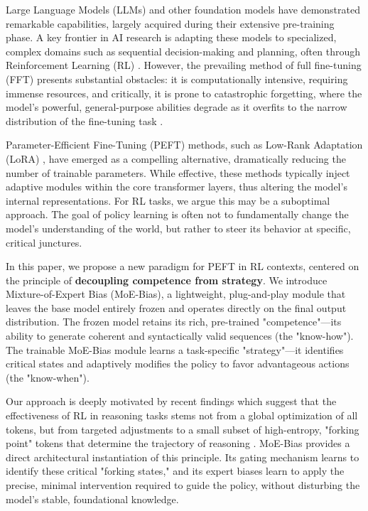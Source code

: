 \documentclass[a4paper]{article}
\begin{document}
Large Language Models (LLMs) and other foundation models have demonstrated remarkable capabilities, largely acquired during their extensive pre-training phase. A key frontier in AI research is adapting these models to specialized, complex domains such as sequential decision-making and planning, often through Reinforcement Learning (RL) \cite{...}. %
However, the prevailing method of full fine-tuning (FFT) presents substantial obstacles: it is computationally intensive, requiring immense resources, and critically, it is prone to catastrophic forgetting, where the model's powerful, general-purpose abilities degrade as it overfits to the narrow distribution of the fine-tuning task \cite{...}. %

Parameter-Efficient Fine-Tuning (PEFT) methods, such as Low-Rank Adaptation (LoRA) \cite{...}, %
have emerged as a compelling alternative, dramatically reducing the number of trainable parameters. While effective, these methods typically inject adaptive modules within the core transformer layers, thus altering the model's internal representations. For RL tasks, we argue this may be a suboptimal approach. The goal of policy learning is often not to fundamentally change the model's understanding of the world, but rather to steer its behavior at specific, critical junctures.

In this paper, we propose a new paradigm for PEFT in RL contexts, centered on the principle of \textbf{decoupling competence from strategy}. We introduce Mixture-of-Expert Bias (MoE-Bias), a lightweight, plug-and-play module that leaves the base model entirely frozen and operates directly on the final output distribution. The frozen model retains its rich, pre-trained "competence"—its ability to generate coherent and syntactically valid sequences (the "know-how"). The trainable MoE-Bias module learns a task-specific "strategy"—it identifies critical states and adaptively modifies the policy to favor advantageous actions (the "know-when").

Our approach is deeply motivated by recent findings which suggest that the effectiveness of RL in reasoning tasks stems not from a global optimization of all tokens, but from targeted adjustments to a small subset of high-entropy, "forking point" tokens that determine the trajectory of reasoning \cite{...}. %
MoE-Bias provides a direct architectural instantiation of this principle. Its gating mechanism learns to identify these critical "forking states," and its expert biases learn to apply the precise, minimal intervention required to guide the policy, without disturbing the model's stable, foundational knowledge.
\end{document}

